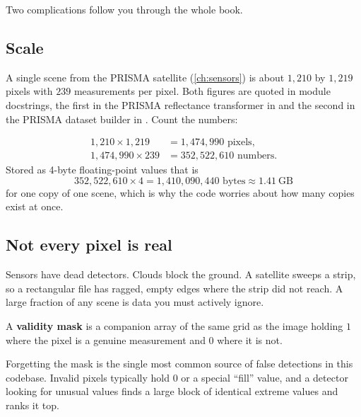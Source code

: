 Two complications follow you through the whole book.

\subsection{Scale}

{\sloppy A single scene from the PRISMA satellite (\cref{ch:sensors}) is about $1{,}210$ by $1{,}219$
pixels with $239$ measurements per pixel. Both figures are quoted in module docstrings, the
first in the PRISMA reflectance transformer in 
\allowbreak{} and the second in the PRISMA
dataset builder in  \allowbreak{}.
Count the numbers:\par}
\begin{align*}
1{,}210 \times 1{,}219 &= 1{,}474{,}990 \text{ pixels},\\
1{,}474{,}990 \times 239 &= 352{,}522{,}610 \text{ numbers}.
\end{align*}
Stored as 4-byte floating-point values that is
\[ 352{,}522{,}610 \times 4 = 1{,}410{,}090{,}440 \text{ bytes} \approx 1.41\ \text{GB} \]
for one copy of one scene, which is why the code worries about how many copies exist at once.

\subsection{Not every pixel is real}

Sensors have dead detectors. Clouds block the ground. A satellite sweeps a strip, so a
rectangular file has ragged, empty edges where the strip did not reach. A large fraction of any
scene is data you must actively ignore.

\begin{definition}
A \textbf{validity mask} is a companion array of the same grid as the image holding $1$ where
the pixel is a genuine measurement and $0$ where it is not.
\end{definition}

Forgetting the mask is the single most common source of false detections in this codebase.
Invalid pixels typically hold $0$ or a special ``fill'' value, and a detector looking for unusual
values finds a large block of identical extreme values and ranks it top.

